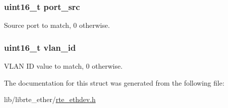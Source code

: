 \subsubsection[{port\+\_\+src}]{\setlength{\rightskip}{0pt plus 5cm}uint16\+\_\+t port\+\_\+src}\label{structrte__fdir__filter_ab1b9c69e1aa78a6c57cacf6afd7c3bc9}
Source port to match, 0 otherwise. \hypertarget{structrte__fdir__filter_ad9a532da576820f8630b96c16692aa5a}{}
\subsubsection[{vlan\+\_\+id}]{\setlength{\rightskip}{0pt plus 5cm}uint16\+\_\+t vlan\+\_\+id}\label{structrte__fdir__filter_ad9a532da576820f8630b96c16692aa5a}
V\+L\+A\+N I\+D value to match, 0 otherwise. 

The documentation for this struct was generated from the following file\+:\begin{DoxyCompactItemize}
\item 
lib/librte\+\_\+ether/\hyperlink{rte__ethdev_8h}{rte\+\_\+ethdev.\+h}\end{DoxyCompactItemize}
